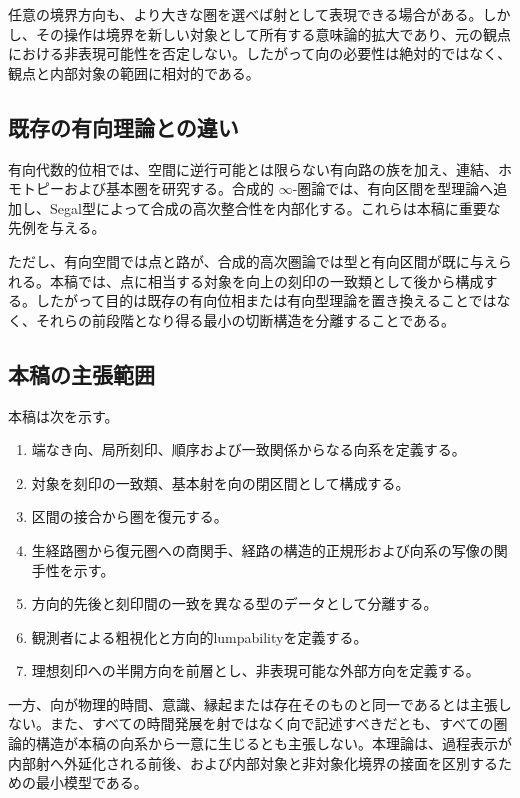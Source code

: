 \documentclass[a4paper,11pt]{ltjsarticle}
\theoremstyle{definition}
\theoremstyle{plain}
\begin{document}
任意の境界方向も、より大きな圏を選べば射として表現できる場合がある。しかし、その操作は境界を新しい対象として所有する意味論的拡大であり、元の観点における非表現可能性を否定しない。したがって向の必要性は絶対的ではなく、観点と内部対象の範囲に相対的である。

\subsection{既存の有向理論との違い}

有向代数的位相では、空間に逆行可能とは限らない有向路の族を加え、連結、ホモトピーおよび基本圏を研究する\cite{Grandis2003Directed}。合成的 $\infty$-圏論では、有向区間を型理論へ追加し、Segal型によって合成の高次整合性を内部化する\cite{RiehlShulman2017}。これらは本稿に重要な先例を与える。

ただし、有向空間では点と路が、合成的高次圏論では型と有向区間が既に与えられる。本稿では、点に相当する対象を向上の刻印の一致類として後から構成する。したがって目的は既存の有向位相または有向型理論を置き換えることではなく、それらの前段階となり得る最小の切断構造を分離することである。

\subsection{本稿の主張範囲}

本稿は次を示す。
\begin{enumerate}
 \item 端なき向、局所刻印、順序および一致関係からなる向系を定義する。
 \item 対象を刻印の一致類、基本射を向の閉区間として構成する。
 \item 区間の接合から圏を復元する。
 \item 生経路圏から復元圏への商関手、経路の構造的正規形および向系の写像の関手性を示す。
 \item 方向的先後と刻印間の一致を異なる型のデータとして分離する。
 \item 観測者による粗視化と方向的lumpabilityを定義する。
 \item 理想刻印への半開方向を前層とし、非表現可能な外部方向を定義する。
\end{enumerate}

一方、向が物理的時間、意識、縁起または存在そのものと同一であるとは主張しない。また、すべての時間発展を射ではなく向で記述すべきだとも、すべての圏論的構造が本稿の向系から一意に生じるとも主張しない。本理論は、過程表示が内部射へ外延化される前後、および内部対象と非対象化境界の接面を区別するための最小模型である。
\end{document}
